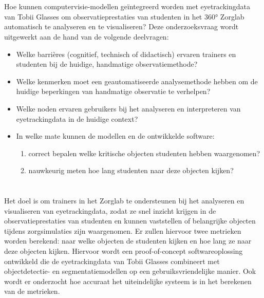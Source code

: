 \section{}%
\label{sec:onderzoeksvraag}

Hoe kunnen computervisie-modellen geïntegreerd worden met eyetrackingdata van Tobii Glasses om observatieprestaties van studenten in het 360° Zorglab automatisch te analyseren en te visualiseren?
Deze onderzoeksvraag wordt uitgewerkt aan de hand van de volgende deelvragen:
\begin{itemize}
    \item Welke barrières (cognitief, technisch of didactisch) ervaren trainers en studenten bij de huidige, handmatige observatiemethode?
    \item Welke kenmerken moet een geautomatiseerde analysemethode hebben om de huidige beperkingen van handmatige observatie te verhelpen?
    \item Welke noden ervaren gebruikers bij het analyseren en interpreteren van eyetrackingdata in de huidige context?
    \item In welke mate kunnen de modellen en de ontwikkelde software:
        \begin{enumerate}
            \item correct bepalen welke kritische objecten studenten hebben waargenomen?
            \item nauwkeurig meten hoe lang studenten naar deze objecten kijken?
        \end{enumerate}
\end{itemize}

\section{}%
\label{sec:onderzoeksdoelstelling}

Het doel is om trainers in het Zorglab te ondersteunen bij het analyseren en visualiseren van eyetrackingdata, zodat ze snel inzicht krijgen in de observatieprestaties van studenten en kunnen 
vaststellen of belangrijke objecten tijdens zorgsimulaties zijn waargenomen. Er zullen hiervoor twee metrieken worden berekend: naar welke objecten de studenten kijken en hoe lang ze naar deze objecten kijken.
Hiervoor wordt een proof-of-concept softwareoplossing ontwikkeld die de eyetrackingdata van Tobii Glasses combineert met objectdetectie- en segmentatiemodellen op een gebruiksvriendelijke manier.
Ook wordt er onderzocht hoe accuraat het uiteindelijke systeem is in het berekenen van de metrieken.

